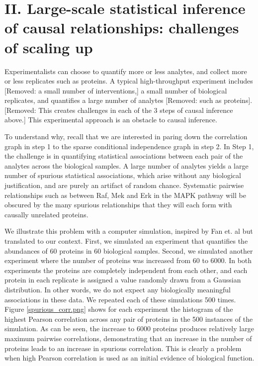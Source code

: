 \documentclass[journal=jacsat,manuscript=article]{achemso}
\def\added#1{{\color{blue} #1}}
\def\removed#1{{\color{magenta}[Removed: #1]}}
\begin{document}
\section{II. Large-scale statistical inference of causal relationships: challenges of scaling up}

\added{Experimentalists can choose to quantify more or less analytes, and collect more or less replicates such as proteins.} A typical high-throughput experiment includes \removed{a small number of interventions,} a small number of biological replicates, and quantifies a large number of analytes \removed{such as proteins}. \removed{This creates challenges in each of the 3 steps of causal inference above.}  \added{This experimental approach is an obstacle to causal inference.}

\added{To understand why, recall that we are interested in paring down the correlation graph in step 1 to the sparse conditional independence graph in step 2.}  In Step 1, the challenge is in quantifying statistical associations between each pair of the analytes across the biological samples. A large number of analytes yields a large number of spurious statistical associations, which arise without any biological justification, and are purely an artifact of random chance. Systematic pairwise relationships such as between Raf, Mek and Erk in the MAPK pathway will be obscured by the many spurious relationships that they will each form with causally unrelated proteins.

We illustrate this problem with a computer simulation, inspired by Fan et. al\cite{fan2014challenges} but translated to our context. First, we simulated an experiment that quantifies the abundances of 60 proteins in 60 biological samples. Second, we simulated another experiment where the number of proteins was increased from 60 to 6000. In both experiments the proteins are completely independent from each other, and each protein in each replicate is assigned a value randomly drawn from a Gaussian distribution. In other words, we do not expect any biologically meaningful associations in these data. We repeated each of these simulations 500 times. Figure \ref{spurious_corr.png} shows for each experiment the histogram of the highest Pearson correlation across any pair of proteins in the 500 instances of the simulation. As can be seen, the increase to 6000 proteins produces relatively large maximum pairwise correlations, demonstrating that an increase in the number of proteins leads to an increase in spurious correlation.  This is clearly a problem when high Pearson correlation is used as an initial evidence of biological function.
\end{document}
